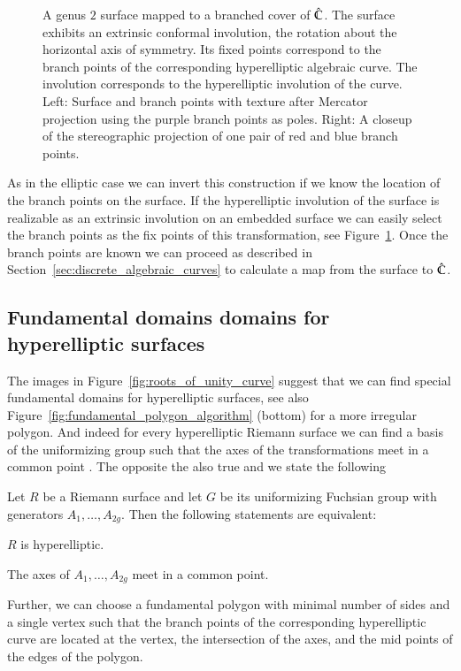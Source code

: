 \documentclass[Thesis]{subfiles}
\begin{document}
\begin{figure} 
\centering
{}
\caption{
A genus $2$ surface mapped to a branched cover of $\hat{\mathbb C}$. 
The surface exhibits an extrinsic conformal involution, the rotation about the horizontal axis of symmetry. 
Its fixed points correspond to the branch points of the corresponding hyperelliptic algebraic curve.
The involution corresponds to the hyperelliptic involution of the curve.  
Left: Surface and branch points with texture after Mercator projection using the purple
branch points as poles. 
Right: A closeup of the stereographic projection of one pair of red and blue branch points.
} 
\label{fig:genus2_branched} 
\end{figure}

As in the elliptic case we can invert this construction if we know the location of the branch points on the surface.
If the hyperelliptic involution of the surface is realizable as an extrinsic involution on an embedded surface we can easily select the branch points as the fix points of this transformation, see Figure~\ref{fig:genus2_branched}. 
Once the branch points are known we can proceed as described in Section~\ref{sec:discrete_algebraic_curves} to calculate a map from the surface to $\hat{\mathbb C}$.

\subsection{Fundamental domains domains for hyperelliptic surfaces}
\label{sec:hyperelliptic_domain}

The images in Figure~\ref{fig:roots_of_unity_curve} suggest that we can find special fundamental domains for hyperelliptic surfaces, see also Figure~\ref{fig:fundamental_polygon_algorithm} (bottom) for a more irregular polygon. 
And indeed for every hyperelliptic Riemann surface we can find a basis of the uniformizing group such that the axes of the transformations meet in a common point \cite{schmutz2000}.
The opposite the also true and we state the following

\begin{theorem}
Let $R$ be a Riemann surface and let $G$ be its uniformizing Fuchsian group with generators $A_1,\ldots,A_{2g}$.
Then the following statements are equivalent:
\begin{compactitem}
\item $R$ is hyperelliptic.
\item The axes of $A_1,\ldots,A_{2g}$ meet in a common point.
\end{compactitem}
Further, we can choose a fundamental polygon with minimal number of sides and a single vertex such that the branch points of the corresponding hyperelliptic curve are located at the vertex, the intersection of the axes, and the mid points of the edges of the polygon.
\end{theorem}
\end{document}
